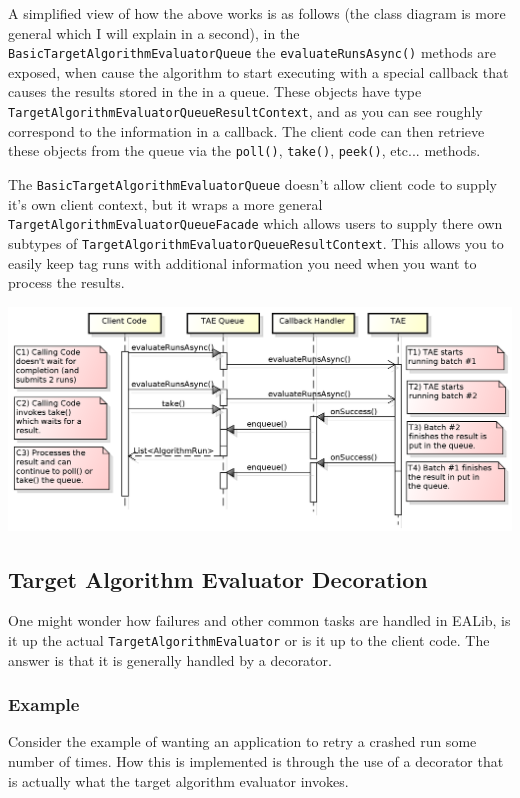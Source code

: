 \documentclass[11pt,letterpaper,oneside]{article}
\begin{document}
A simplified view of how the above works is as follows (the class diagram is more general which I will explain in a second), in the \texttt{BasicTargetAlgorithmEvaluatorQueue} the \texttt{evaluateRunsAsync()} methods are exposed, when cause the algorithm to start executing with a special callback that causes the results stored in the in a queue. These objects have type\\ \texttt{TargetAlgorithmEvaluatorQueueResultContext}, and as you can see roughly correspond to the information in a callback. The client code can then retrieve these objects from the queue via the \texttt{poll()}, \texttt{take()}, \texttt{peek()}, etc... methods.

The \texttt{BasicTargetAlgorithmEvaluatorQueue} doesn't allow client code to supply it's own client context, but it wraps a more general \texttt{TargetAlgorithmEvaluatorQueueFacade} which allows users to supply there own subtypes of \texttt{TargetAlgorithmEvaluatorQueueResultContext}. This allows you to easily keep tag runs with additional information you need when you want to process the results.

\begin{center}
\includegraphics[scale=0.60]{img/UML/TAESequence4.png}
\end{center}

\subsection{Target Algorithm Evaluator Decoration}

One might wonder how failures and other common tasks are handled in EALib, is it up the actual \texttt{TargetAlgorithmEvaluator} or is it up to the client code. The answer is that it is generally handled by a decorator.

\subsubsection{Example}
 \label{sec:decoration-example}
 Consider the example of wanting an application to retry a crashed run some number of times. How this is implemented is through the use of a decorator that is actually what the target algorithm evaluator invokes.
 
\end{document}
